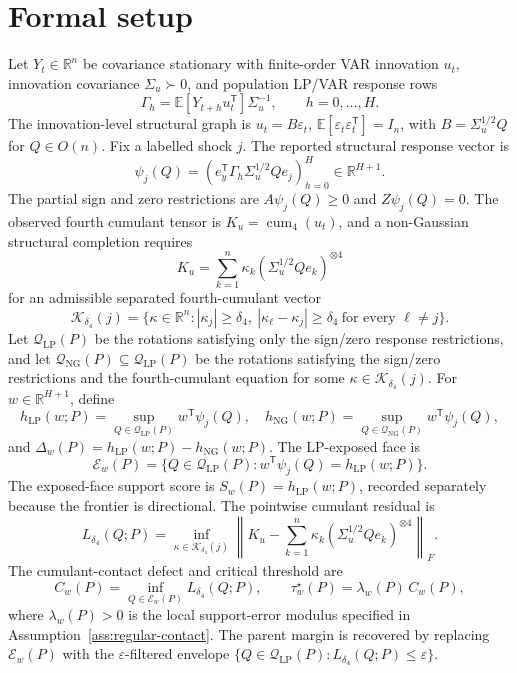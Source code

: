 \documentclass[11pt]{article}
\newcommand{\E}{\mathbb{E}}
\newcommand{\transpose}{\mathsf{T}}
\newcommand{\R}{\mathbb{R}}
\theoremstyle{definition}
\theoremstyle{plain}
\theoremstyle{remark}
\begin{document}
\section{Formal setup}
Let \(Y_t\in\R^n\) be covariance stationary with finite-order VAR innovation \(u_t\), innovation covariance \(\Sigma_u\succ0\), and population LP/VAR response rows
\[
\Gamma_h=\E[Y_{t+h}u_t^\transpose]\Sigma_u^{-1},\qquad h=0,\ldots,H.
\]
The innovation-level structural graph is \(u_t=B\varepsilon_t\), \(\E[\varepsilon_t\varepsilon_t^\transpose]=I_n\), with \(B=\Sigma_u^{1/2}Q\) for \(Q\in O(n)\).  Fix a labelled shock \(j\).  The reported structural response vector is
\[
\psi_j(Q)=\left(e_y^\transpose\Gamma_h\Sigma_u^{1/2}Qe_j\right)_{h=0}^H\in\R^{H+1}.
\]
The partial sign and zero restrictions are \(A\psi_j(Q)\ge0\) and \(Z\psi_j(Q)=0\).  The observed fourth cumulant tensor is \(K_u=\operatorname{cum}_4(u_t)\), and a non-Gaussian structural completion requires
\[
K_u=\sum_{k=1}^n \kappa_k\left(\Sigma_u^{1/2}Qe_k\right)^{\otimes4}
\]
for an admissible separated fourth-cumulant vector
\[
\mathcal K_{\delta_4}(j)=\{\kappa\in\R^n:|\kappa_j|\ge\delta_4,\ |\kappa_\ell-\kappa_j|\ge\delta_4\ \text{for every }\ell\ne j\}.
\]
Let \(\mathcal Q_{\mathrm{LP}}(P)\) be the rotations satisfying only the sign/zero response restrictions, and let \(\mathcal Q_{\mathrm{NG}}(P)\subseteq\mathcal Q_{\mathrm{LP}}(P)\) be the rotations satisfying the sign/zero restrictions and the fourth-cumulant equation for some \(\kappa\in\mathcal K_{\delta_4}(j)\).  For \(w\in\R^{H+1}\), define
\[
h_{\mathrm{LP}}(w;P)=\sup_{Q\in\mathcal Q_{\mathrm{LP}}(P)}w^\transpose\psi_j(Q),\quad
h_{\mathrm{NG}}(w;P)=\sup_{Q\in\mathcal Q_{\mathrm{NG}}(P)}w^\transpose\psi_j(Q),
\]
and \(\Delta_w(P)=h_{\mathrm{LP}}(w;P)-h_{\mathrm{NG}}(w;P)\).  The LP-exposed face is
\[
\mathcal E_w(P)=\{Q\in\mathcal Q_{\mathrm{LP}}(P):w^\transpose\psi_j(Q)=h_{\mathrm{LP}}(w;P)\}.
\]
The exposed-face support score is \(S_w(P)=h_{\mathrm{LP}}(w;P)\), recorded separately because the frontier is directional.  The pointwise cumulant residual is
\[
L_{\delta_4}(Q;P)=
\inf_{\kappa\in\mathcal K_{\delta_4}(j)}
\left\|K_u-\sum_{k=1}^n\kappa_k(\Sigma_u^{1/2}Qe_k)^{\otimes4}\right\|_F.
\]
The cumulant-contact defect and critical threshold are
\[
C_w(P)=\inf_{Q\in\mathcal E_w(P)}L_{\delta_4}(Q;P),\qquad
\tau_w^\star(P)=\lambda_w(P)\,C_w(P),
\]
where \(\lambda_w(P)>0\) is the local support-error modulus specified in Assumption~\ref{ass:regular-contact}.  The parent margin is recovered by replacing \(\mathcal E_w(P)\) with the \(\varepsilon\)-filtered envelope \(\{Q\in\mathcal Q_{\mathrm{LP}}(P):L_{\delta_4}(Q;P)\le\varepsilon\}\).
\end{document}
